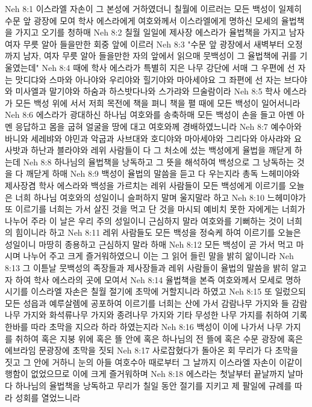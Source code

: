 Neh 8:1  이스라엘 자손이 그 본성에 거하였더니 칠월에 이르러는 모든 백성이 일제히 수문 앞 광장에 모여 학사 에스라에게 여호와께서 이스라엘에게 명하신 모세의 율법책을 가지고 오기를 청하매
Neh 8:2  칠월 일일에 제사장 에스라가 율법책을 가지고 남자 여자 무릇 알아 들을만한 회중 앞에 이르러
Neh 8:3  "수문 앞 광장에서 새벽부터 오정까지 남자, 여자 무릇 알아 들을만한 자의 앞에서 읽으매 뭇백성이 그 율법책에 귀를 기울였는데"
Neh 8:4  때에 학사 에스라가 특별히 지은 나무 강단에 서매 그 우편에 선 자는 맛디댜와 스마와 아나야와 우리야와 힐기야와 마아세야요 그 좌편에 선 자는 브다야와 미사엘과 말기야와 하숨과 하스밧다나와 스가랴와 므술람이라
Neh 8:5  학사 에스라가 모든 백성 위에 서서 저희 목전에 책을 펴니 책을 펼 때에 모든 백성이 일어서니라
Neh 8:6  에스라가 광대하신 하나님 여호와를 송축하매 모든 백성이 손을 들고 아멘 아멘 응답하고 몸을 굽혀 얼굴을 땅에 대고 여호와께 경배하였느니라
Neh 8:7  예수아와 바니와 세레뱌와 야민과 악굽과 사브대와 호디야와 마아세야와 그리다와 아사랴와 요사밧과 하난과 블라야와 레위 사람들이 다 그 처소에 섰는 백성에게 율법을 깨닫게 하는데
Neh 8:8  하나님의 율법책을 낭독하고 그 뜻을 해석하여 백성으로 그 낭독하는 것을 다 깨닫게 하매
Neh 8:9  백성이 율법의 말씀을 듣고 다 우는지라 총독 느헤미야와 제사장겸 학사 에스라와 백성을 가르치는 레위 사람들이 모든 백성에게 이르기를 오늘은 너희 하나님 여호와의 성일이니 슬퍼하지 말며 울지말라 하고
Neh 8:10  느헤미야가 또 이르기를 너희는 가서 살진 것을 먹고 단 것을 마시되 예비치 못한 자에게는 너희가 나누어 주라 이 날은 우리 주의 성일이니 근심하지 말라 여호와를 기뻐하는 것이 너희의 힘이니라 하고
Neh 8:11  레위 사람들도 모든 백성을 정숙케 하여 이르기를 오늘은 성일이니 마땅히 종용하고 근심하지 말라 하매
Neh 8:12  모든 백성이 곧 가서 먹고 마시며 나누어 주고 크게 즐거워하였으니 이는 그 읽어 들린 말을 밝히 앎이니라
Neh 8:13  그 이튿날 뭇백성의 족장들과 제사장들과 레위 사람들이 율법의 말씀을 밝히 알고자 하여 학사 에스라의 곳에 모여서
Neh 8:14  율법책을 본즉 여호와께서 모세로 명하시기를 이스라엘 자손은 칠월 절기에 초막에 거할지니라 하였고
Neh 8:15  또 일렀으되 모든 성읍과 예루살렘에 공포하여 이르기를 너희는 산에 가서 감람나무 가지와 들 감람나무 가지와 화석류나무 가지와 종려나무 가지와 기타 무성한 나무 가지를 취하여 기록한바를 따라 초막을 지으라 하라 하였는지라
Neh 8:16  백성이 이에 나가서 나무 가지를 취하여 혹은 지붕 위에 혹은 뜰 안에 혹은 하나님의 전 뜰에 혹은 수문 광장에 혹은 에브라임 문광장에 초막을 짓되
Neh 8:17  사로잡혔다가 돌아온 회 무리가 다 초막을 짓고 그 안에 거하니 눈의 아들 여호수아 때로부터 그 날까지 이스라엘 자손이 이같이 행함이 없었으므로 이에 크게 즐거워하며
Neh 8:18  에스라는 첫날부터 끝날까지 날마다 하나님의 율법책을 낭독하고 무리가 칠일 동안 절기를 지키고 제 팔일에 규례를 따라 성회를 열었느니라
